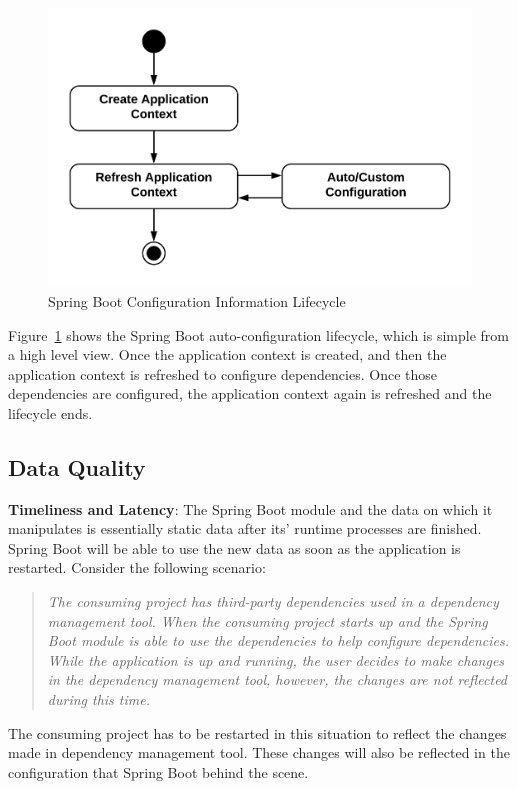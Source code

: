\begin{figure}[H]
    \centering
    \includegraphics[width=.7\textwidth]{content/architectural-views-top-level/information-lifecycle.png}
    \caption{Spring Boot Configuration Information Lifecycle}
    \label{information-lifecycle-diagram}
\end{figure}

Figure~\ref{information-lifecycle-diagram} shows the Spring Boot auto-configuration lifecycle, which is simple from a high level view. Once the application context is created, and then the application context is refreshed to configure dependencies. Once those dependencies are configured, the application context again is refreshed and the lifecycle ends.\\

\subsection{Data Quality}

\textbf{Timeliness and Latency}: The Spring Boot module and the data on which it manipulates is essentially static data after its' runtime processes are finished. Spring Boot will be able to use the new data as soon as the application is restarted. Consider the following scenario:

\begin{quote}
\textit{The consuming project has third-party dependencies used in a dependency management tool. When the consuming project starts up and the Spring Boot module is able to use the dependencies to help configure dependencies. While the application is up and running, the user decides to make changes in the dependency management tool, however, the changes are not reflected during this time.}
\end{quote}

The consuming project has to be restarted in this situation to reflect the changes made in dependency management tool. These changes will also be reflected in the configuration that Spring Boot behind the scene.\\

